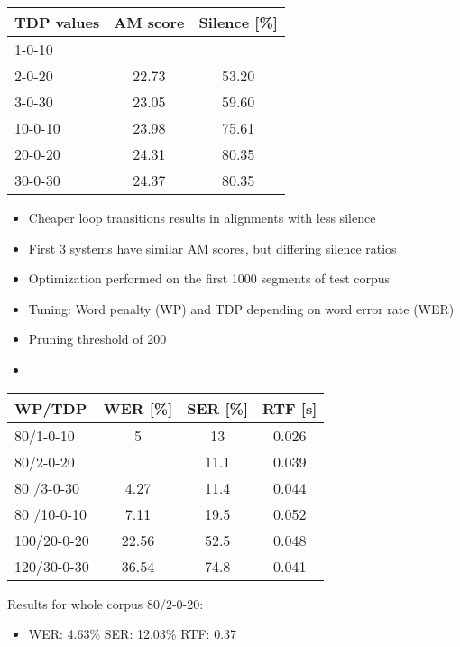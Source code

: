 \documentclass[11pt, a4paper, landscape]{article}
\begin{document}
\begin{center}
\begin{tabular}{| l |  c | c |} \toprule
  TDP values & AM score           & Silence [\%]      \\ \midrule
  1-0-10     & \color{red}{22.68} & \color{red}{43.48}\\
  2-0-20     & 22.73              & 53.20             \\
  3-0-30     & 23.05              & 59.60             \\ \midrule
  10-0-10    & 23.98              & 75.61             \\
  20-0-20    & 24.31              & 80.35             \\
  30-0-30    & 24.37              & 80.35             \\ \bottomrule
\end{tabular}
\end{center}
\begin{itemize}
	\item Cheaper loop transitions results in alignments with less silence
	\item First 3 systems have similar AM scores, but differing silence ratios
\end{itemize}
\vfill


\NewPage{}
\vfill
\begin{itemize}
	\item Optimization performed on the first 1000 segments of test corpus
	\item Tuning: Word penalty (WP) and TDP depending on word error rate (WER)
	\item Pruning threshold of 200
	\item \color{red}{no need to show SER and RTF if you tune on WER and RTF is not given in seconds. It's a ratio :)}
\end{itemize}

\begin{center}
	\begin{tabular}{| l | c | c | c |} \toprule
		WP/TDP      &    WER [\%]    & SER [\%]    & RTF [s]    \\ \midrule
		80/1-0-10   &    5           &    13       & 0.026      \\
		80/2-0-20   &\color{red}{4.2}&    11.1     & 0.039      \\
		80 /3-0-30  &    4.27        &    11.4     & 0.044      \\ \midrule
		80 /10-0-10 &    7.11        &    19.5     & 0.052      \\
		100/20-0-20 &    22.56       &    52.5     & 0.048      \\
		120/30-0-30 &    36.54       &    74.8     & 0.041      \\ \bottomrule
		
	\end{tabular}
\end{center}
Results for whole corpus 80/2-0-20:
\begin{itemize}
	\item WER: 4.63\% SER: 12.03\%  RTF: 0.37
\end{itemize}
\vfill
\end{document}
